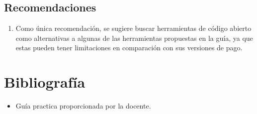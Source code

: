\documentclass[12pt]{article}
\begin{document}
                \subsection{Recomendaciones}
                        \begin{enumerate}
                                \item Como única recomendación, se sugiere buscar herramientas de código abierto como alternativas a algunas de las herramientas propuestas en la guía, ya que estas pueden tener limitaciones en comparación con sus versiones de pago.
                        \end{enumerate}


        \section{Bibliografía}
                \begin{itemize}
                        \item Guía practica proporcionada por la docente. 
                \end{itemize}
\end{document}
